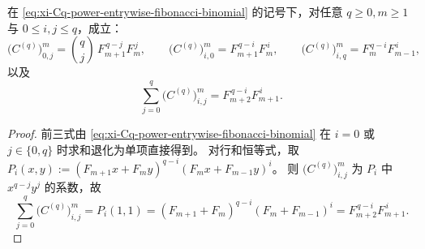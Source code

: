 \begin{corollary}[边界条目与行和闭式]\label{cor:xi-Cq-power-boundary-and-row-sum}
在 \eqref{eq:xi-Cq-power-entrywise-fibonacci-binomial} 的记号下，对任意 \(q\ge 0,m\ge 1\) 与 \(0\le i,j\le q\)，成立：
\[
\bigl(C^{(q)}\bigr)^m_{0,j}=\binom{q}{j}\,F_{m+1}^{\,q-j}F_m^{\,j},
\qquad
\bigl(C^{(q)}\bigr)^m_{i,0}=F_{m+1}^{\,q-i}F_m^{\,i},
\qquad
\bigl(C^{(q)}\bigr)^m_{i,q}=F_m^{\,q-i}F_{m-1}^{\,i},
\]
以及
\[
\sum_{j=0}^{q}\bigl(C^{(q)}\bigr)^m_{i,j}=F_{m+2}^{\,q-i}F_{m+1}^{\,i}.
\]
\end{corollary}
\begin{proof}
前三式由 \eqref{eq:xi-Cq-power-entrywise-fibonacci-binomial} 在 \(i=0\) 或 \(j\in\{0,q\}\) 时求和退化为单项直接得到。
对行和恒等式，取
\(
P_i(x,y):=(F_{m+1}x+F_my)^{q-i}(F_mx+F_{m-1}y)^i
\)。
则 \(\bigl(C^{(q)}\bigr)^m_{i,j}\) 为 \(P_i\) 中 \(x^{q-j}y^j\) 的系数，故
\[
\sum_{j=0}^{q}\bigl(C^{(q)}\bigr)^m_{i,j}=P_i(1,1)
=(F_{m+1}+F_m)^{q-i}(F_m+F_{m-1})^i
=F_{m+2}^{\,q-i}F_{m+1}^{\,i}.
\]
\end{proof}

